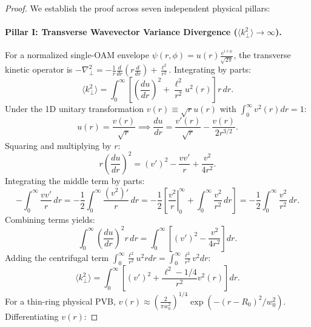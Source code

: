 \documentclass[11pt,a4paper]{article}
\begin{document}
\begin{proof}
We establish the proof across seven independent physical pillars:

\paragraph{Pillar I: Transverse Wavevector Variance Divergence ($\langle k_\perp^2 \rangle \to \infty$).}
For a normalized single-OAM envelope $\psi(r, \phi) = u(r) \frac{e^{i \ell \phi}}{\sqrt{2\pi}}$, the transverse kinetic operator is $-\nabla_\perp^2 = -\frac{1}{r}\frac{d}{dr}(r\frac{d}{dr}) + \frac{\ell^2}{r^2}$. Integrating by parts:
\begin{equation}
\langle k_\perp^2 \rangle = \int_0^\infty \left[ \left( \frac{du}{dr} \right)^2 + \frac{\ell^2}{r^2} u^2(r) \right] r \, dr.
\label{eq:kperp_integral}
\end{equation}
Under the 1D unitary transformation $v(r) \equiv \sqrt{r} u(r)$ with $\int_0^\infty v^2(r) dr = 1$:
\begin{equation}
u(r) = \frac{v(r)}{\sqrt{r}} \implies \frac{du}{dr} = \frac{v'(r)}{\sqrt{r}} - \frac{v(r)}{2 r^{3/2}}.
\label{eq:unitary_trans}
\end{equation}
Squaring and multiplying by $r$:
\begin{equation}
r \left( \frac{du}{dr} \right)^2 = (v')^2 - \frac{v v'}{r} + \frac{v^2}{4 r^2}.
\label{eq:squared_derivative}
\end{equation}
Integrating the middle term by parts:
\begin{equation}
- \int_0^\infty \frac{v v'}{r} \, dr = - \frac{1}{2} \int_0^\infty \frac{(v^2)'}{r} \, dr = - \frac{1}{2} \left[ \left. \frac{v^2}{r} \right|_0^\infty + \int_0^\infty \frac{v^2}{r^2} \, dr \right] = - \frac{1}{2} \int_0^\infty \frac{v^2}{r^2} \, dr.
\label{eq:parts_integration}
\end{equation}
Combining terms yields:
\begin{equation}
\int_0^\infty \left( \frac{du}{dr} \right)^2 r \, dr = \int_0^\infty \left[ (v')^2 - \frac{v^2}{4 r^2} \right] dr.
\label{eq:radial_kinetic_trans}
\end{equation}
Adding the centrifugal term $\int_0^\infty \frac{\ell^2}{r^2} u^2 r dr = \int_0^\infty \frac{\ell^2}{r^2} v^2 dr$:
\begin{equation}
\langle k_\perp^2 \rangle = \int_0^\infty \left[ (v')^2 + \frac{\ell^2 - 1/4}{r^2} v^2(r) \right] dr.
\label{eq:kperp_exact_v}
\end{equation}
For a thin-ring physical PVB, $v(r) \approx (\frac{2}{\pi w_0^2})^{1/4} \exp(-(r - R_0)^2 / w_0^2)$. Differentiating $v(r)$:

\end{proof}
\end{document}
